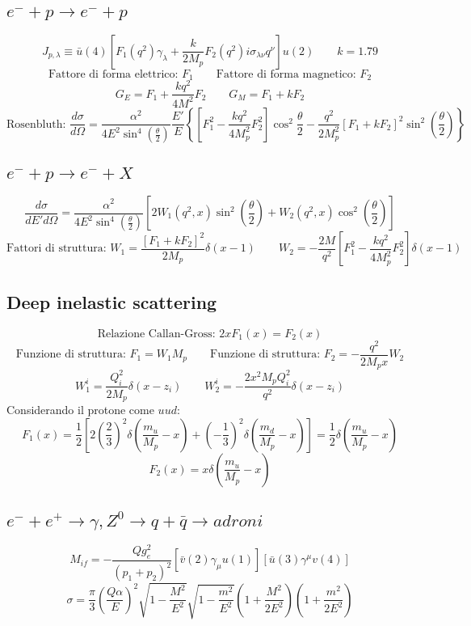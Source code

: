 \documentclass[10pt, onecolumn, a4paper]{article}
\def\({\left(}
\def\){\right)}
\def\[{\left[}
\def\]{\right]}
\begin{document}
\subsection{$e^-+p\to e^-+p$} %
$$J_{p,\lambda}\equiv \bar u\(4\)\[F_1\(q^2\)\gamma_{\lambda}+\frac{k}{2M_p}F_2\(q^2\)i\sigma_{\lambda\nu}q^{\nu}\]u\(2\) \qquad k=1.79$$
$$\textrm{Fattore di forma elettrico: } F_1 \qquad \textrm{Fattore di forma magnetico: } F_2$$
$$G_E=F_1+\frac{kq^2}{4M^2}F_2 \qquad G_M=F_1+kF_2$$
$$\textrm{Rosenbluth: } \frac{d\sigma}{d\Omega}=\frac{\alpha^2}{4E^2\sin^4{\(\frac{\theta}{2}\)}}\frac{E'}{E}\left\{\[F_1^2-\frac{kq^2}{4M_p^2}F^2_2\]\cos^2{\frac{\theta}{2}}-\frac{q^2}{2M_p^2}\[F_1+kF_2\]^2\sin^2{\(\frac{\theta}{2}\)}\right\}$$

\subsection{$e^-+p\to e^-+X$} %
$$\frac{d\sigma}{dE'd\Omega}=\frac{\alpha^2}{4E^2\sin^4{\(\frac{\theta}{2}\)}}\[2W_1\(q^2,x\)\sin^2{\(\frac{\theta}{2}\)}+W_2\(q^2,x\)\cos^2{\(\frac{\theta}{2}\)}\]$$
$$\textrm{Fattori di struttura: } W_1=\frac{\[F_1+kF_2\]^2}{2M_p}\delta\(x-1\) \qquad W_2=-\frac{2M}{q^2}\[F_1^2-\frac{kq^2}{4M_p^2}F_2^2\]\delta\(x-1\)$$

\subsection{Deep inelastic scattering} %
$$\textrm{Relazione Callan-Gross: } 2xF_1\(x\)=F_2\(x\)$$
$$\textrm{Funzione di struttura: } F_1=W_1M_p \qquad \textrm{Funzione di struttura: } F_2=-\frac{q^2}{2M_px}W_2$$
$$W_1^i=\frac{Q_i^2}{2M_p}\delta\(x-z_i\) \qquad W_2^i=-\frac{2x^2M_pQ_i^2}{q^2}\delta\(x-z_i\)$$
Considerando il protone come $uud$:
$$F_1\(x\)=\frac{1}{2}\[2\(\frac{2}{3}\)^2\delta\(\frac{m_u}{M_p}-x\)+\(-\frac{1}{3}\)^2\delta\(\frac{m_d}{M_p}-x\)\]=\frac{1}{2}\delta\(\frac{m_u}{M_p}-x\)$$
$$F_2\(x\)=x\delta\(\frac{m_u}{M_p}-x\)$$

\subsection{$e^-+e^+\to \gamma,Z^0\to q+\bar q\to adroni$} %
$$M_{if}=-\frac{Qg_e^2}{\(p_1+p_2\)^2}\[\bar v\(2\)\gamma_{\mu}u\(1\)\]\[\bar u\(3\)\gamma^{\mu}v\(4\)\]$$
$$\sigma=\frac{\pi}{3}\(\frac{Q\alpha}{E}\)^2\sqrt{1-\frac{M^2}{E^2}}\sqrt{1-\frac{m^2}{E^2}}\(1+\frac{M^2}{2E^2}\)\(1+\frac{m^2}{2E^2}\)$$
\end{document}
